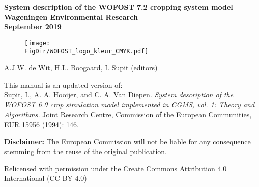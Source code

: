 \documentclass[a4paper,12pt,oneside]{book}
\newcommand{\FigDir}{D:/UserData/sources/WOFOST_system_docs/latex/figs}
\begin{document}

\frontmatter
\begin{titlepage}
	\centering
	\vfill
	{\bfseries
		{\LARGE
		System description of the WOFOST 7.2 cropping system model}\\
		\vskip0.5cm
		{\large
			Wageningen Environmental Research\\ 
   	        \vskip0.5cm
			September 2019}\\

		\begin{figure}[h]
		\texttt{[image: \\FigDir/WOFOST\_logo\_kleur\_CMYK.pdf]}
	    \end{figure}
		\vskip1cm

		{\large A.J.W. de Wit, H.L. Boogaard, I. Supit (editors)}\\
		\vskip0.5cm
     }
     {\small 

	This manual is an updated version of:\\
    Supit, I., A. A. Hooijer, and C. A. Van Diepen. 
	\textit{System description of the WOFOST 6.0 crop simulation model implemented in CGMS, vol. 1: 
    Theory and Algorithms.} Joint Research Centre, Commission of the European Communities, EUR 15956 
             (1994): 146.
             
    \textbf{Disclaimer:} The European Commission will not be liable for any consequence stemming from the reuse of the
     original publication.
     
    Relicensed with permission under the Create Commons Attribution 4.0 International (CC BY 4.0)
    }
\end{titlepage}
\tableofcontents
\listoffigures
\listoftables
\cleardoublepage

\mainmatter





%
%
%
%

\backmatter
\appendix



\end{document}
